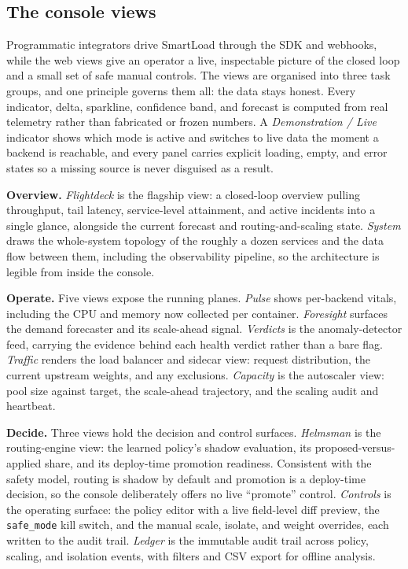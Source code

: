 \subsection{The console views}
\label{sec:ima:pages}

Programmatic integrators drive SmartLoad through the SDK and webhooks, while the web
views give an operator a live, inspectable picture of the closed loop and a small
set of safe manual controls. The views are organised into three task groups, and one
principle governs them all: the data stays honest. Every indicator, delta,
sparkline, confidence band, and forecast is computed from real telemetry rather than
fabricated or frozen numbers. A \emph{Demonstration / Live} indicator shows which
mode is active and switches to live data the moment a backend is reachable, and
every panel carries explicit loading, empty, and error states so a missing source is
never disguised as a result.

\textbf{Overview.} \emph{Flightdeck} is the flagship view: a closed-loop overview
pulling throughput, tail latency, service-level attainment, and active incidents
into a single glance, alongside the current forecast and routing-and-scaling state.
\emph{System} draws the whole-system topology of the roughly a dozen services and
the data flow between them, including the observability pipeline, so the architecture
is legible from inside the console.

\textbf{Operate.} Five views expose the running planes. \emph{Pulse} shows
per-backend vitals, including the CPU and memory now collected per container.
\emph{Foresight} surfaces the demand forecaster and its scale-ahead signal.
\emph{Verdicts} is the anomaly-detector feed, carrying the evidence behind each
health verdict rather than a bare flag. \emph{Traffic} renders the load balancer
and sidecar view: request distribution, the current upstream weights, and any
exclusions. \emph{Capacity} is the autoscaler view: pool size against target, the
scale-ahead trajectory, and the scaling audit and heartbeat.

\textbf{Decide.} Three views hold the decision and control surfaces.
\emph{Helmsman} is the routing-engine view: the learned policy's shadow
evaluation, its proposed-versus-applied share, and its deploy-time promotion
readiness. Consistent with the safety model, routing is shadow by default and
promotion is a deploy-time decision, so the console deliberately offers no live
``promote'' control. \emph{Controls} is the operating surface: the policy editor
with a live field-level diff preview, the \texttt{safe\_mode} kill switch, and the
manual scale, isolate, and weight overrides, each written to the audit trail.
\emph{Ledger} is the immutable audit trail across policy, scaling, and isolation
events, with filters and CSV export for offline analysis.


